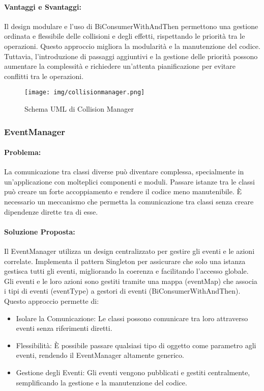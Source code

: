 \documentclass[a4paper,12pt]{report}
\begin{document}
	\paragraph{Vantaggi e Svantaggi:} Il design modulare e l’uso di BiConsumerWithAndThen permettono una gestione ordinata e flessibile delle collisioni e degli effetti, rispettando le priorità tra le operazioni. Questo approccio migliora la modularità e la manutenzione del codice. Tuttavia, l’introduzione di passaggi aggiuntivi e la gestione delle priorità possono aumentare la complessità e richiedere un’attenta pianificazione per evitare conflitti tra le operazioni.
	
	\begin{figure}[H]
		\centering
		\texttt{[image: img/collisionmanager.png]}
		\caption{Schema UML di Collision Manager}
		\label{img:collisionmanager}
	\end{figure}
	
	
	\subsubsection{EventManager}
	\paragraph{Problema:} La comunicazione tra classi diverse può diventare complessa, specialmente in un’applicazione con molteplici componenti e moduli. Passare istanze tra le classi può creare un forte accoppiamento e rendere il codice meno manutenibile. È necessario un meccanismo che permetta la comunicazione tra classi senza creare dipendenze dirette tra di esse.
	\paragraph{Soluzione Proposta:} Il EventManager utilizza un design centralizzato per gestire gli eventi e le azioni correlate. Implementa il pattern Singleton per assicurare che solo una istanza gestisca tutti gli eventi, migliorando la coerenza e facilitando l’accesso globale. Gli eventi e le loro azioni sono gestiti tramite una mappa (eventMap) che associa i tipi di eventi (eventType) a gestori di eventi (BiConsumerWithAndThen). Questo approccio permette di:
	\begin{itemize}
		\item Isolare la Comunicazione: Le classi possono comunicare tra loro attraverso eventi senza riferimenti diretti.
		\item Flessibilità: È possibile passare qualsiasi tipo di oggetto come parametro agli eventi, rendendo il EventManager altamente generico.
		\item Gestione degli Eventi: Gli eventi vengono pubblicati e gestiti centralmente, semplificando la gestione e la manutenzione del codice.
	\end{itemize}
\end{document}
